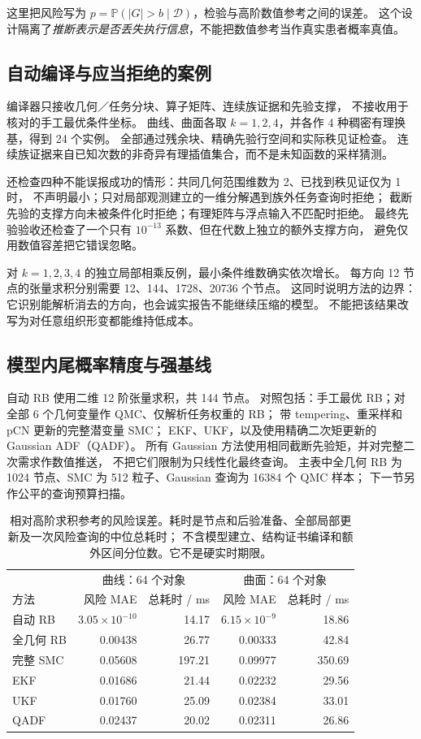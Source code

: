 \documentclass[11pt,a4paper]{article}
\numberwithin{equation}{section}
\theoremstyle{definition}
\newcommand{\Prob}{\mathbb P}
\newcommand{\D}{\mathcal D}
\begin{document}
这里把风险写为 \(p=\Prob(|G|>b\mid\D)\)，检验与高阶数值参考之间的误差。
这个设计隔离了\emph{推断表示是否丢失执行信息}，不能把数值参考当作真实患者概率真值。

\subsection{自动编译与应当拒绝的案例}
编译器只接收几何／任务分块、算子矩阵、连续族证据和先验支撑，
不接收用于核对的手工最优条件坐标。
曲线、曲面各取 \(k=1,2,4\)，并各作 4 种稠密有理换基，得到 24 个实例。
全部通过残余块、精确先验行空间和实际秩见证检查。
连续族证据来自已知次数的非奇异有理插值集合，而不是未知函数的采样猜测。

还检查四种不能误报成功的情形：共同几何范围维数为 2、已找到秩见证仅为 1 时，
不声明最小；只对局部观测建立的一维分解遇到族外任务查询时拒绝；
截断先验的支撑方向未被条件化时拒绝；有理矩阵与浮点输入不匹配时拒绝。
最终先验验收还检查了一个只有 \(10^{-13}\) 系数、但在代数上独立的额外支撑方向，
避免仅用数值容差把它错误忽略。

对 \(k=1,2,3,4\) 的独立局部相乘反例，最小条件维数确实依次增长。
每方向 12 节点的张量求积分别需要 12、144、1728、20736 个节点。
这同时说明方法的边界：它识别能解析消去的方向，也会诚实报告不能继续压缩的模型。
不能把该结果改写为对任意组织形变都能维持低成本。

\subsection{模型内尾概率精度与强基线}
自动 RB 使用二维 12 阶张量求积，共 144 节点。
对照包括：手工最优 RB；对全部 6 个几何变量作 QMC、仅解析任务权重的 RB；
带 tempering、重采样和 pCN 更新的完整潜变量 SMC；
EKF、UKF，以及使用精确二次矩更新的 Gaussian ADF（QADF）。
所有 Gaussian 方法使用相同截断先验矩，并对完整二次需求作数值推送，
不把它们限制为只线性化最终查询。
主表中全几何 RB 为 1024 节点、SMC 为 512 粒子、Gaussian 查询为 16384 个 QMC 样本；
下一节另作公平的查询预算扫描。

\begin{table}[ht]
\centering\small
\begin{tabular}{lrrrr}
\toprule
 & \multicolumn{2}{c}{曲线：64 个对象} & \multicolumn{2}{c}{曲面：64 个对象}\\
方法 & 风险 MAE & 总耗时 / ms & 风险 MAE & 总耗时 / ms\\
\midrule
自动 RB & \(3.05\!\times\!10^{-10}\) & 14.17 & \(6.15\!\times\!10^{-9}\) & 18.86\\
全几何 RB & 0.00438 & 26.77 & 0.00333 & 42.84\\
完整 SMC & 0.05608 & 197.21 & 0.09977 & 350.69\\
EKF & 0.01686 & 21.44 & 0.02232 & 29.56\\
UKF & 0.01760 & 25.09 & 0.02384 & 33.01\\
QADF & 0.02437 & 20.02 & 0.02311 & 26.86\\
\bottomrule
\end{tabular}
\caption{相对高阶求积参考的风险误差。耗时是节点和后验准备、全部局部更新及一次风险查询的中位总耗时；
不含模型建立、结构证书编译和额外区间分位数。它不是硬实时期限。}
\label{tab:inference}
\end{table}
\end{document}
